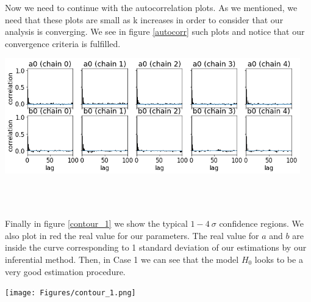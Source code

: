 \documentclass[onecolumn,           %
               showpacs,            %
               preprintnumbers,     %
               aps,                 %
               letterpaper,             %
               superscriptaddress,      %
               nofootinbib,         %
               tightenlines,        %
               floats,floatfix      %
               ,usenatbib,
               ]{revtex4-1}
\begin{document}
Now we need to continue with the autocorrelation plots. As we mentioned, we need that these plots are small as k increases in order to consider that our analysis is converging. We see in figure \ref{autocorr} such plots and notice that our convergence criteria is fulfilled.

\begin{minipage}{\textwidth}
\centering
\includegraphics[height=5cm]{Figures/autocorr_1.png}
\label{autocorr}
\end{minipage}
\\$ $

Finally in figure \ref{contour_1} we show the typical $1-4\ \sigma$ confidence regions. We also plot in red the real value for our parameters. The real value for $a$ and $b$ are inside the curve corresponding to 1 standard deviation of our estimations by our inferential method. Then, in Case 1 we can see that the model $H_0$ looks to be a very good estimation procedure.

\begin{minipage}{\textwidth}
\centering
\texttt{[image: Figures/contour\_1.png]}
\label{contour_1}
\end{minipage}\\ $ $
\end{document}

